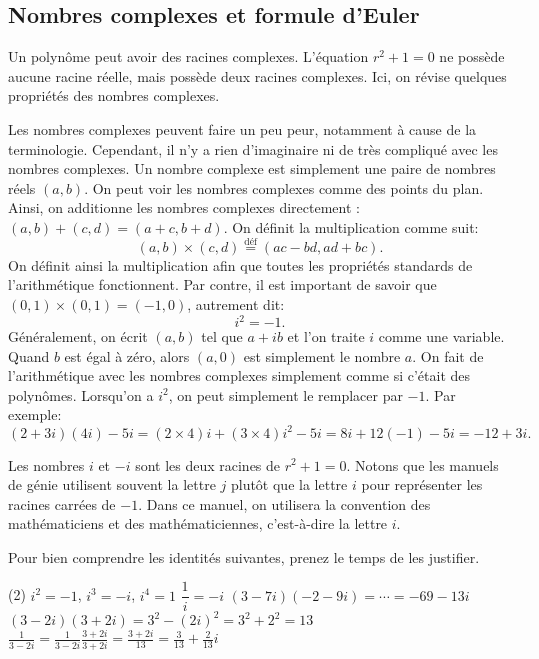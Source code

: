 \subsection{Nombres complexes et formule d'Euler}

Un polynôme peut avoir des racines complexes. 
L'équation  $r^2 + 1 = 0$ ne possède aucune racine réelle, mais possède deux racines complexes. 
Ici, on révise quelques propriétés des nombres complexes.

Les nombres complexes peuvent faire un peu peur, notamment à cause de la terminologie. 
Cependant, il n'y a rien d'imaginaire ni de très compliqué avec les nombres complexes. 
Un nombre complexe est simplement une paire de nombres réels $(a,b)$.  
On peut voir les nombres complexes comme des points du plan. 
Ainsi, on additionne les nombres complexes directement :  $(a, b)+(c, d)=(a+c, b+d)$.  On définit la multiplication  comme suit: 
\begin{equation*}
	(a, b) \times (c, d) \overset{\text{déf}}{=} (ac-bd, ad+bc) .
\end{equation*}
On définit ainsi la multiplication afin que toutes les propriétés standards de l'arithmétique fonctionnent. 
Par contre, il est important de savoir que  $(0,1) \times (0, 1) = (-1, 0)$, autrement dit:
\begin{equation*}
	i^2=-1.
\end{equation*}
Généralement, on écrit  $(a, b)$ tel que $a+ib$ et l'on traite $i$ comme une variable.  
Quand $b$ est égal à zéro, alors $(a,0)$ est simplement le nombre $a$.
On fait de l'arithmétique avec les nombres complexes simplement comme si c'était des polynômes. 
Lorsqu'on a $i^2$, on peut simplement le remplacer par  $-1$.
Par exemple: 
\begin{equation*}
	(2+3i)(4i) - 5i = (2\times 4)i + (3 \times 4) i^2 - 5i
					= 8i + 12 (-1) - 5i
					= -12 + 3i .
\end{equation*}

Les nombres $i$ et $-i$ sont les deux racines de $r^2 + 1 = 0$.
Notons que les manuels de génie utilisent souvent la lettre $j$ plutôt que la lettre $i$ pour représenter les racines carrées de $-1$. Dans ce manuel, on utilisera la convention des mathématiciens et des mathématiciennes, c'est-à-dire la lettre  $i$.

\begin{exercise}
	Pour bien comprendre les identités suivantes, prenez le temps de les justifier. 
	\begin{tasks}(2)
		\task $i^2 = -1$, $i^3 = -i$, $i^4 = 1$
		\task $\dfrac{1}{i} = -i$
		\task $(3-7i)(-2-9i) = \cdots = -69-13i$
		\task $(3-2i)(3+2i) = 3^2 - {(2i)}^2 = 3^2 + 2^2 = 13$
		\task $\frac{1}{3-2i} = \frac{1}{3-2i} \frac{3+2i}{3+2i} = \frac{3+2i}{13}
							  = \frac{3}{13}+\frac{2}{13}i$
	\end{tasks}
\end{exercise}

